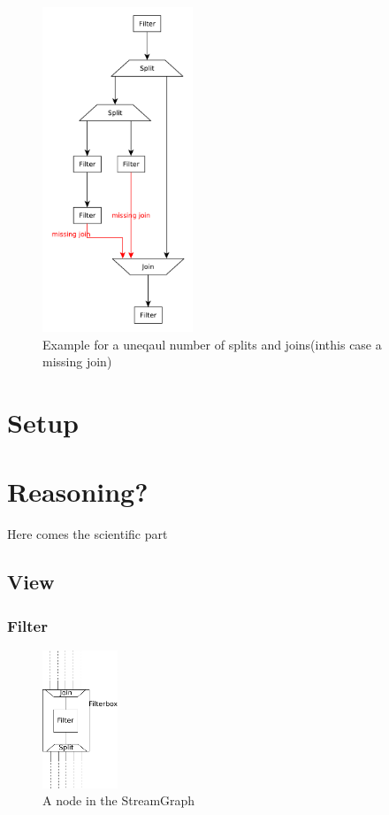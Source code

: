 \documentclass[journal]{IEEEtran}
\begin{document}
\begin{figure}[h]
	\centering
	\includegraphics[width=0.4\textwidth]{StreamItTopologyMissingJoin}
	\caption{Example for a uneqaul number of splits and joins(inthis case a missing join)}
	\label{fig_StreamIt_topology_missing_join}
\end{figure}




\section{Setup}

\section{Reasoning?}
\noindent Here comes the scientific part
\subsection{View}
\subsubsection{Filter}
\begin{figure}[h]
	\centering
	\includegraphics[width=0.2\textwidth]{FilterBoxGraphic}
	\caption{A node in the StreamGraph}
	\label{fig_filter_node}
\end{figure}
\end{document}
